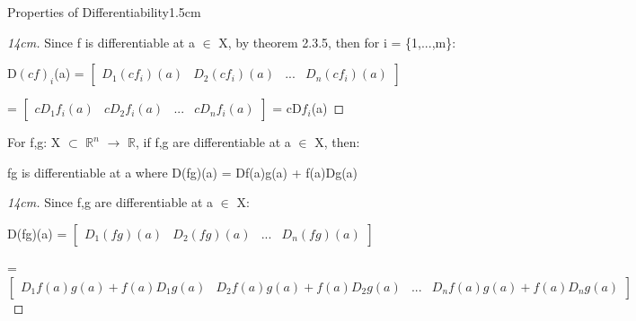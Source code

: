 \begin{ltheorem}{Properties of Differentiability}{1.5cm}
            \begin{proof}[14cm]
                Since f is differentiable at a $\in$ X,
                by {\color{red} theorem 2.3.5}, then for i = \{1,...,m\}:

                \hspace{0.5cm}
                D$(cf)_i$(a) =
                $
                \begin{bmatrix}
                    D_1(cf_i)(a)
                    & D_2(cf_i)(a)
                    & ...
                    & D_n(cf_i)(a)
                \end{bmatrix}
                $

                \hspace{2.3cm}
                = $
                \begin{bmatrix}
                    cD_1f_i(a)
                    & cD_2f_i(a)
                    & ...
                    & cD_nf_i(a)
                \end{bmatrix}
                $
                = cD$f_i$(a)
            \end{proof}

            \newpage

        \item For f,g: X $\subset$ $\mathbb{R}^n$ $\rightarrow$ $\mathbb{R}$,
            if f,g are differentiable at a $\in$ X, then:

            \hspace{0.5cm}
            fg is differentiable at a where D(fg)(a) = Df(a)g(a) + f(a)Dg(a)

            \begin{proof}[14cm]
                Since f,g are differentiable at a $\in$ X:

                \hspace{0.2cm}
                D(fg)(a) =
                $
                \begin{bmatrix}
                    D_1(fg)(a)
                    & D_2(fg)(a)
                    & ...
                    & D_n(fg)(a)
                \end{bmatrix}
                $

                \hspace{0.2cm}
                = $
                \begin{bmatrix}
                    \scriptstyle D_1f(a)g(a)+f(a)D_1g(a)
                    & \scriptstyle D_2f(a)g(a)+f(a)D_2g(a)
                    & \scriptstyle ...
                    & \scriptstyle D_nf(a)g(a)+f(a)D_ng(a)
                \end{bmatrix}
                $


\end{proof}
\end{ltheorem}
